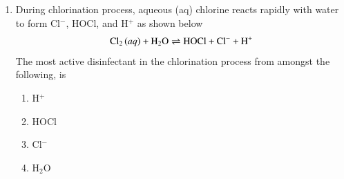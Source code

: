 \documentclass[journal]{IEEEtran}
\begin{document}
\begin{enumerate}
\item During chlorination process, aqueous (aq) chlorine reacts rapidly with water to form Cl$^{-}$, HOCl, and H$^{+}$ as shown below
\begin{align*}
    \text{Cl}_2 \left(aq\right) + \text{H}_2 \text{O} \rightleftharpoons \text{HOCl} + \text{Cl}^{-} + \text{H}^{+}
\end{align*}
The most active disinfectant in the chlorination process from amongst the following, is
\begin{multicols}{2}
    \begin{enumerate}
        \item H$^{+}$
        \item HOCl
        \item Cl$^{-}$
        \item H$_2$O
    \end{enumerate}
\end{multicols}
\end{enumerate}
\end{document}

